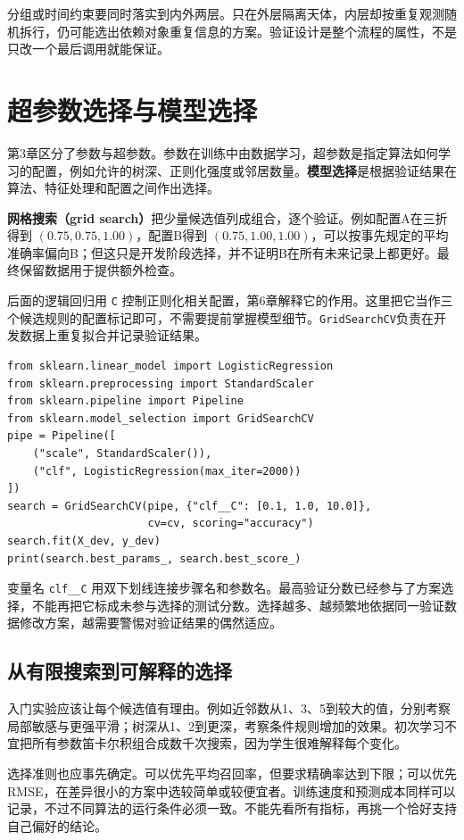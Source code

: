 分组或时间约束要同时落实到内外两层。只在外层隔离天体，内层却按重复观测随机拆行，仍可能选出依赖对象重复信息的方案。验证设计是整个流程的属性，不是只改一个最后调用就能保证。

\section{超参数选择与模型选择}
第3章区分了参数与超参数。参数在训练中由数据学习，超参数是指定算法如何学习的配置，例如允许的树深、正则化强度或邻居数量。\textbf{模型选择}是根据验证结果在算法、特征处理和配置之间作出选择。

\textbf{网格搜索（grid search）}把少量候选值列成组合，逐个验证。例如配置A在三折得到 $(0.75,0.75,1.00)$，配置B得到 $(0.75,1.00,1.00)$，可以按事先规定的平均准确率偏向B；但这只是开发阶段选择，并不证明B在所有未来记录上都更好。最终保留数据用于提供额外检查。

后面的逻辑回归用 \texttt{C} 控制正则化相关配置，第6章解释它的作用。这里把它当作三个候选规则的配置标记即可，不需要提前掌握模型细节。\texttt{GridSearchCV}负责在开发数据上重复拟合并记录验证结果。
\begin{lstlisting}[caption={把候选配置限制在开发数据中比较}]
from sklearn.linear_model import LogisticRegression
from sklearn.preprocessing import StandardScaler
from sklearn.pipeline import Pipeline
from sklearn.model_selection import GridSearchCV
pipe = Pipeline([
    ("scale", StandardScaler()),
    ("clf", LogisticRegression(max_iter=2000))
])
search = GridSearchCV(pipe, {"clf__C": [0.1, 1.0, 10.0]},
                      cv=cv, scoring="accuracy")
search.fit(X_dev, y_dev)
print(search.best_params_, search.best_score_)
\end{lstlisting}

变量名 \texttt{clf\_\_C} 用双下划线连接步骤名和参数名。最高验证分数已经参与了方案选择，不能再把它标成未参与选择的测试分数。选择越多、越频繁地依据同一验证数据修改方案，越需要警惕对验证结果的偶然适应。

\subsection{从有限搜索到可解释的选择}
入门实验应该让每个候选值有理由。例如近邻数从1、3、5到较大的值，分别考察局部敏感与更强平滑；树深从1、2到更深，考察条件规则增加的效果。初次学习不宜把所有参数笛卡尔积组合成数千次搜索，因为学生很难解释每个变化。

选择准则也应事先确定。可以优先平均召回率，但要求精确率达到下限；可以优先RMSE，在差异很小的方案中选较简单或较便宜者。训练速度和预测成本同样可以记录，不过不同算法的运行条件必须一致。不能先看所有指标，再挑一个恰好支持自己偏好的结论。

